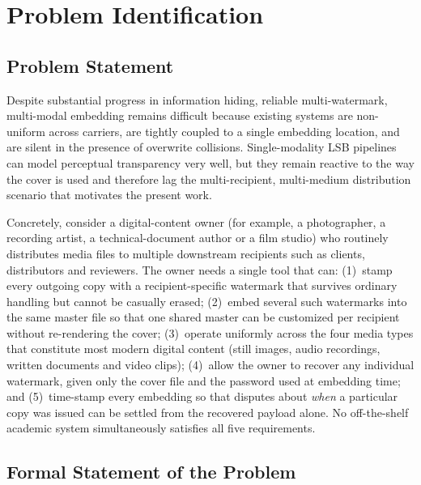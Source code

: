 \chapter{Problem Identification}
\label{Problem_Identification}

\section{Problem Statement}

Despite substantial progress in information hiding, reliable multi-watermark, multi-modal embedding remains difficult because existing systems are non-uniform across carriers, are tightly coupled to a single embedding location, and are silent in the presence of overwrite collisions. Single-modality LSB pipelines can model perceptual transparency very well, but they remain reactive to the way the cover is used and therefore lag the multi-recipient, multi-medium distribution scenario that motivates the present work.

Concretely, consider a digital-content owner (for example, a photographer, a recording artist, a technical-document author or a film studio) who routinely distributes media files to multiple downstream recipients such as clients, distributors and reviewers. The owner needs a single tool that can: (1)~stamp every outgoing copy with a recipient-specific watermark that survives ordinary handling but cannot be casually erased; (2)~embed several such watermarks into the same master file so that one shared master can be customized per recipient without re-rendering the cover; (3)~operate uniformly across the four media types that constitute most modern digital content (still images, audio recordings, written documents and video clips); (4)~allow the owner to recover any individual watermark, given only the cover file and the password used at embedding time; and (5)~time-stamp every embedding so that disputes about \emph{when} a particular copy was issued can be settled from the recovered payload alone. No off-the-shelf academic system simultaneously satisfies all five requirements.

\section{Formal Statement of the Problem}

